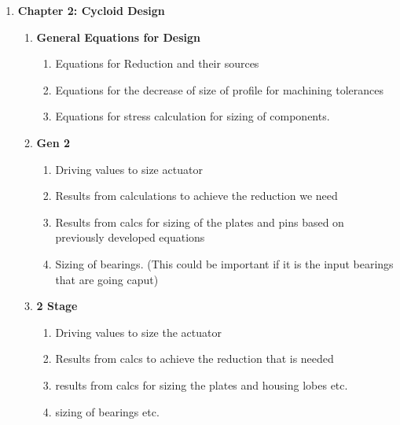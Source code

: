 \begin{enumerate}
\begin{enumerate}
\begin{enumerate}
	\end{enumerate}

	\item \textbf{Chapter 2: Cycloid Design}
	\begin{enumerate}
		\item \textbf{General Equations for Design}
		\begin{enumerate}
			\item 
			Equations for Reduction and their sources 
			\item
			Equations for the decrease of size of profile for machining tolerances 
			\item 
			Equations for stress calculation for sizing of components. 
		\end{enumerate}

		\item \textbf{Gen 2}
		\begin{enumerate}
			\item
			Driving values to size actuator 
			\item 
			Results from calculations to achieve the reduction we need 
			\item
			Results from calcs for sizing of the plates and pins based on previously developed equations 
			\item 
			Sizing of bearings. (This could be important if it is the input bearings that are going caput) 
		\end{enumerate}

		\item \textbf{2 Stage}
		\begin{enumerate}
			\item
			Driving values to size the actuator
			\item
			Results from calcs to achieve the reduction that is needed 
			\item 
			results from calcs for sizing the plates and housing lobes etc.
			\item
			sizing of bearings etc.  
		\end{enumerate}
	\end{enumerate}


\end{enumerate}
\end{enumerate}
